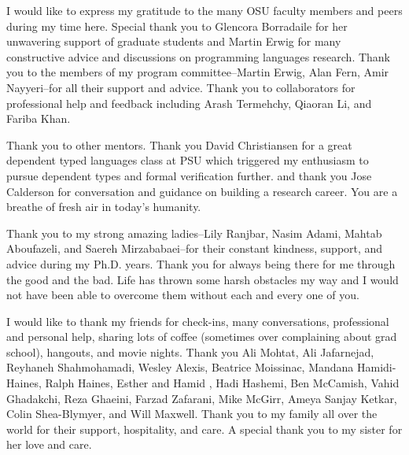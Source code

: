 I would like to express my gratitude to the many OSU faculty members and peers during my time here. 
Special thank you to Glencora Borradaile for her unwavering support 
of graduate students and Martin Erwig for many constructive advice and discussions on 
programming languages research. 
Thank you to the members of my program committee--Martin Erwig, 
Alan Fern, Amir Nayyeri--for all their support and advice. 
%
Thank you to collaborators for professional help and feedback including
Arash Termehchy, Qiaoran Li, and Fariba Khan. 

%
Thank you to other mentors. 
Thank you David Christiansen for a great dependent typed languages class at PSU
which triggered my enthusiasm to pursue dependent types and formal verification further.
and thank you Jose Calderson for conversation and guidance on building a research career. You
are a breathe of fresh air in today's humanity.
%


Thank you to my strong amazing ladies--Lily Ranjbar, 
Nasim Adami, Mahtab Aboufazeli, and Saereh Mirzababaei--for their constant kindness, 
support, and advice during my Ph.D. years. Thank you for always being there for me 
through the good and the bad. Life has thrown some harsh obstacles my way and I 
would not have been able to overcome them without each and every one of you. 
%

%
I would like to thank my friends for 
check-ins, many conversations, professional and personal help, sharing lots of coffee (sometimes over complaining about grad school), hangouts, and movie nights.
Thank you Ali Mohtat, Ali Jafarnejad, 
 Reyhaneh Shahmohamadi, Wesley Alexis,
Beatrice Moissinac, Mandana Hamidi-Haines, Ralph Haines, 
Esther and Hamid , Hadi Hashemi, Ben McCamish, Vahid Ghadakchi, Reza Ghaeini, Farzad Zafarani, Mike McGirr, Ameya Sanjay Ketkar, Colin Shea-Blymyer, and Will Maxwell.
%
Thank you to my family all over the world for their support, hospitality, and care.
A special thank you to my sister for her love and care. 

